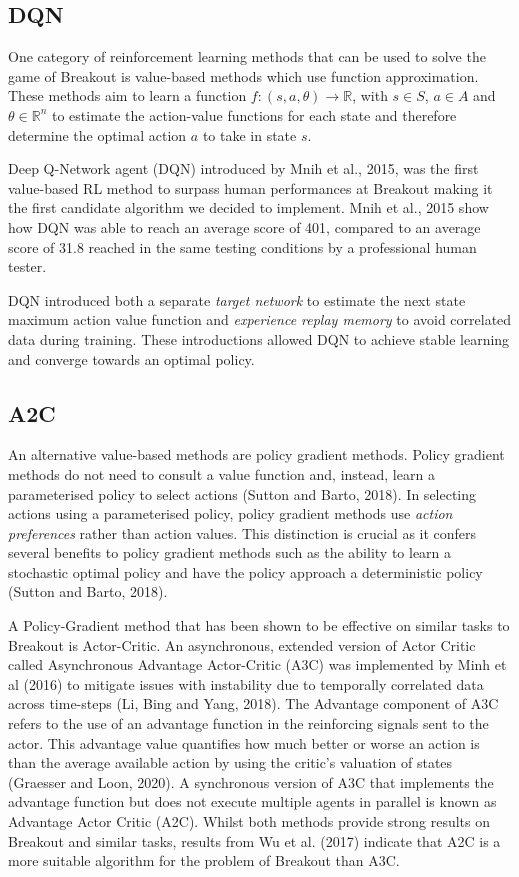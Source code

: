\documentclass{article}
\begin{document}
\subsection{DQN}
One category of reinforcement learning methods that can be used to solve the game of Breakout is value-based methods which use function approximation.
These methods aim to learn a function $f: (s,a,\theta) \rightarrow \mathbb{R}$, with $s \in S$,  $a \in A$ and  $\theta \in \mathbb{R}^n$ to estimate the action-value functions for each state and therefore determine the optimal action $a$ to take in state $s$.

Deep Q-Network agent (DQN) introduced by Mnih et al., 2015, was the first value-based RL method to surpass human performances at Breakout making it the first candidate algorithm we decided to implement.
Mnih et al., 2015 show how DQN was able to reach an average score of 401, compared to an average score of 31.8 reached in the same testing conditions by a professional human tester.

DQN introduced both a separate \emph{target network} to estimate the next state maximum action value function and \emph{experience replay memory} to avoid correlated data during training. These introductions allowed DQN to achieve stable learning and converge towards an optimal policy.

\subsection{A2C}

An alternative value-based methods are policy gradient methods. Policy gradient methods do not need to consult a value function and, instead, learn a parameterised policy to select actions (Sutton and Barto, 2018). In selecting actions using a parameterised policy, policy gradient methods use \emph{action preferences} rather than action values. This distinction is crucial as it confers several benefits to policy gradient methods such as the ability to learn a stochastic optimal policy and have the policy approach a deterministic policy (Sutton and Barto, 2018).

A Policy-Gradient method that has been shown to be effective on similar tasks to Breakout is Actor-Critic. An asynchronous, extended version of Actor Critic called Asynchronous Advantage Actor-Critic (A3C) was implemented by Minh et al (2016) to mitigate issues with instability due to temporally correlated data across time-steps (Li, Bing and Yang, 2018). The Advantage component of A3C refers to the use of an advantage function in the reinforcing signals sent to the actor. This advantage value quantifies how much better or worse an action is than the average available action by using the critic's valuation of states (Graesser and Loon, 2020). A synchronous version of A3C that implements the advantage function but does not execute multiple agents in parallel is known as Advantage Actor Critic (A2C). Whilst both methods provide strong results on Breakout and similar tasks, results from Wu et al. (2017) indicate that A2C is a more suitable algorithm for the problem of Breakout than A3C.
\end{document}

